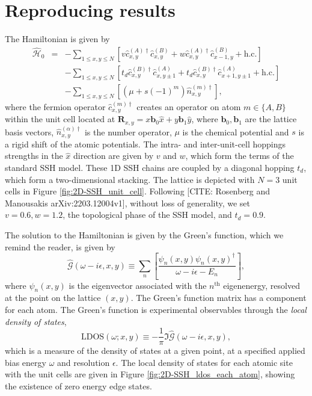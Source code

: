 \section{Reproducing results}
The Hamiltonian is given by
\begin{eqnarray}
    \hat{\mathcal{H}}_{0}&=&
    -\sum_{1\leq x,y\leq N} \left[
        v \hat{c}^{(A)\dagger}_{ x,y } \hat{c}_{ x,y }^{(B)}
    + w \hat{c}^{(A)\dagger}_{ x,y } \hat{c}_{ x-1,y }^{(B)} + \text{h.c.} \right]
    \nonumber \\
    &&-\sum_{1\leq x,y\leq N} 
    \left[ t_d \hat{c}^{(B)\dagger}_{ x,y } \hat{c}_{ x,y\pm1 }^{(A)}
    + t_d \hat{c}^{(B)\dagger}_{ x,y } \hat{c}_{ x+1,y\pm1 }^{(A)} + \text{h.c.} \right] \nonumber \\
      &&-\sum_{1\leq x,y\leq N} \left[\left( \mu + s(-1)^m \right) \hat{n}^{(m)\dagger}_{ x,y } \right]
,
\end{eqnarray}
where the fermion operator $\hat{c}^{(m)\dagger}_{ x,y }$ creates an operator on atom $m\in\{A,B\}$ within the unit cell located at $\mathbf{R}_{x,y}= x \mathbf{b}_0\hat{x}+y \mathbf{b}_1 \hat{y}$,
where $\mathbf{b}_0, \mathbf{b}_1$ are the lattice basis vectors,
$\hat{n}^{(\alpha)\dagger}_{ x,y }$ is the number operator, $\mu$ is the chemical potential and $s$ is a rigid shift of the atomic potentials.
The intra- and inter-unit-cell hoppings strengths in the $\hat{x}$ direction are given by $v$ and $w$, which form the terms of the standard SSH model.
These 1D SSH chains are coupled by a diagonal hopping $t_d$, which form a two-dimensional stacking.
The lattice is depicted with $N=3$ unit cells in Figure \ref{fig:2D-SSH_unit_cell}. 
Following [CITE: Rosenberg and Manousakis arXiv:2203.12004v1], without loss of generality, we set $v=0.6, w=1.2$, the topological phase of the SSH model, and $t_d=0.9$.


The solution to the Hamiltonian is given by the Green's function, which we remind the reader, is given by
\begin{equation}
    \hat{\mathcal{G}}(\omega-i\epsilon,x,y)
    \equiv
    \sum_n\left[
        \frac{\psi_n(x,y)\psi_n(x,y)^\dagger}{\omega-i\epsilon-E_n}
        \right],
\end{equation}
where $\psi_n(x,y)$ is the eigenvector associated with the $n^\text{th}$ eigenenergy, resolved at the point on the lattice $(x,y)$. 
The Green's function matrix has a component for each atom.
The Green's function is experimental observables through the {\it local density of states},
\begin{equation}
    \text{LDOS}(\omega;x,y)
    \equiv
    -\frac{1}{\pi}\Im\hat{\mathcal{G}}(\omega-i\epsilon,x,y)
,
\end{equation}
which is a measure of the density of states at a given point, at a specified applied bias energy $\omega$ and resolution $\epsilon$.
The local density of states for each atomic site with the unit cells are given in Figure \ref{fig:2D-SSH_ldos_each_atom}, showing the existence of zero energy edge states.

